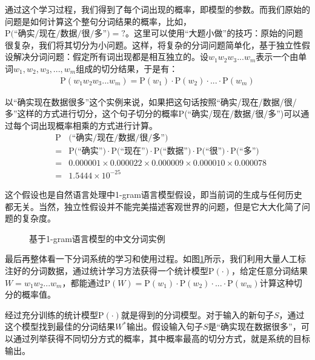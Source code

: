 \parinterval 通过这个学习过程，我们得到了每个词出现的概率，即模型的参数。而我们原始的问题是如何计算这个整句分词结果的概率，比如，$\textrm{P}\textrm{(``确实/现在/数据/很/多'')}=?$。这里可以使用``大题小做''的技巧：原始的问题很复杂，我们将其切分为小问题。这样，将复杂的分词问题简单化，基于独立性假设解决分词问题：假定所有词出现都是相互独立的。设$w_1 w_2 w_3...w_m$表示一个由单词$w_1,w_2,w_3,...,w_m$组成的切分结果，于是有：
{\setlength{\belowdisplayskip}{-9pt}
\begin{eqnarray}
\textrm{P}(w_1 w_2 w_3...w_m)=\textrm{P}(w_1) \cdot \textrm{P}(w_2) \cdot ... \cdot \textrm{P}(w_m)
\label{eq:2-20}
\end{eqnarray}
}


\parinterval 以``确实现在数据很多''这个实例来说，如果把这句话按照``确实/现在/数据/很/多''这样的方式进行切分，这个句子切分的概率P(``确实/现在/数据/很/多'')可以通过每个词出现概率相乘的方式进行计算。
\begin{eqnarray}
&\textrm{P}&\textrm{(``确实/现在/数据/很/多'')} \nonumber \\
& = &\textrm{P}\textrm{(``确实'')} \cdot \textrm{P}\textrm{(``现在'')} \cdot \textrm{P}\textrm{(``数据'')} \cdot \textrm{P}\textrm{(``很'')} \cdot \textrm{P}\textrm{(``多'')} \nonumber \\
& = &0.000001 \times 0.000022 \times 0.000009 \times 0.000010 \times 0.000078 \nonumber \\
& = &1.5444 \times 10^{-25}
\label{eq:2-21}
\end{eqnarray}

这个假设也是自然语言处理中1-gram语言模型假设，即当前词的生成与任何历史都无关。当然，独立性假设并不能完美描述客观世界的问题，但是它大大化简了问题的复杂度。

\begin{figure}[htp]
\centering

\caption{基于1-gram语言模型的中文分词实例}
\label{fig:2-17}
\end{figure}

\parinterval 最后再整体看一下分词系统的学习和使用过程。如图\ref {fig:2-17}所示，我们利用大量人工标注好的分词数据，通过统计学习方法获得一个统计模型$\textrm{P}(\cdot)$，给定任意分词结果$W=w_1 w_2...w_m$，都能通过$\textrm{P}(W)=\textrm{P}(w_1) \cdot \textrm{P}(w_2 ) \cdot ... \cdot \textrm{P}(w_m)$计算这种切分的概率值。

\parinterval 经过充分训练的统计模型$\textrm{P}(\cdot)$就是得到的分词模型。对于输入的新句子$S$，通过这个模型找到最佳的分词结果$W^*$输出。假设输入句子$S$是``确实现在数据很多''，可以通过列举获得不同切分方式的概率，其中概率最高的切分方式，就是系统的目标输出。

